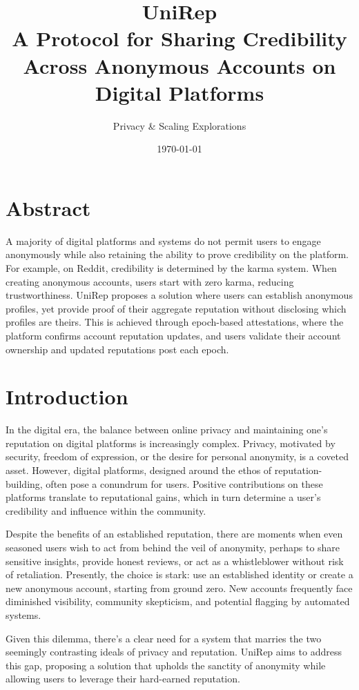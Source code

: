 \documentclass[11pt]{article}
\author{Privacy \& Scaling Explorations}
\date{\today}
\title{UniRep\\\medskip
\large A Protocol for Sharing Credibility Across Anonymous Accounts on Digital Platforms}
\begin{document}
\maketitle
\tableofcontents

\section{Abstract}
\label{sec:org7aacae6}

A majority of digital platforms and systems do not permit users to engage anonymously while also retaining the ability to prove credibility on the platform. For example, on Reddit, credibility is determined by the karma system. When creating anonymous accounts, users start with zero karma, reducing trustworthiness. UniRep proposes a solution where users can establish anonymous profiles, yet provide proof of their aggregate reputation without disclosing which profiles are theirs. This is achieved through epoch-based attestations, where the platform confirms account reputation updates, and users validate their account ownership and updated reputations post each epoch.
\section{Introduction}
\label{sec:orgd679496}

In the digital era, the balance between online privacy and maintaining one's reputation on digital platforms is increasingly complex. Privacy, motivated by security, freedom of expression, or the desire for personal anonymity, is a coveted asset. However, digital platforms, designed around the ethos of reputation-building, often pose a conundrum for users. Positive contributions on these platforms translate to reputational gains, which in turn determine a user's credibility and influence within the community.

Despite the benefits of an established reputation, there are moments when even seasoned users wish to act from behind the veil of anonymity, perhaps to share sensitive insights, provide honest reviews, or act as a whistleblower without risk of retaliation. Presently, the choice is stark: use an established identity or create a new anonymous account, starting from ground zero. New accounts frequently face diminished visibility, community skepticism, and potential flagging by automated systems.

Given this dilemma, there's a clear need for a system that marries the two seemingly contrasting ideals of privacy and reputation. UniRep aims to address this gap, proposing a solution that upholds the sanctity of anonymity while allowing users to leverage their hard-earned reputation.
\end{document}
